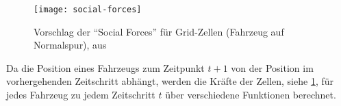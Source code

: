 \begin{figure}[hptb]
 \centering
 \texttt{[image: social-forces]}
 \caption[\enquote{Social Forces} für Grid-Zellen]{Vorschlag der \enquote{Social Forces} für Grid-Zellen (Fahrzeug auf Normalspur), aus \cite{dat-ba}}
 \label{figure:social-forces}
\end{figure}
\noindent

Da die Position eines Fahrzeugs zum Zeitpunkt $t + 1$ von der Position im vorhergehenden Zeitschritt abhängt, werden die Kräfte der Zellen, siehe \cref{figure:social-forces}, für jedes Fahrzeug zu jedem Zeitschritt $t$ über verschiedene Funktionen berechnet. 

